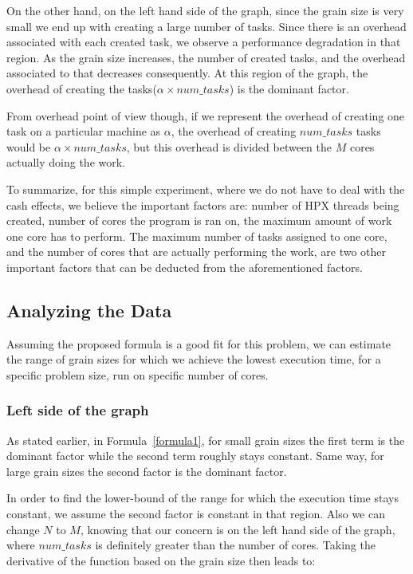 On the other hand, on the left hand side of the graph, since the grain size is very small we end up with creating a large number of tasks. Since there is an overhead associated with each created task, we observe a performance degradation in that region. As the grain size increases, the number of created tasks, and the overhead associated to that decreases consequently. At this region of the graph, the overhead of creating the tasks($\alpha\times{num\_{tasks}}$) is the dominant factor.   





From overhead point of view though, if we represent the overhead of creating one task on a particular machine as $\alpha$, the overhead of creating $num\_{tasks}$ tasks would be $\alpha\times{num\_{tasks}}$, but this overhead is divided between the $M$ cores actually doing the work. 

To summarize, for this simple experiment, where we do not have to deal with the cash effects, we believe the important factors are: number of HPX threads being created, number of cores the program is ran on, the maximum amount of work one core has to perform. The maximum number of tasks assigned to one core, and the number of cores that are actually performing the work, are two other important factors that can be deducted from the aforementioned factors. 

\vspace{\baselineskip}
\subsection{Analyzing the Data}
Assuming the proposed formula is a good fit for this problem, we can estimate the range of grain sizes for which we achieve the lowest execution time, for a specific problem size, run on specific number of cores.

\vspace{\baselineskip}
\subsubsection{Left side of the graph}
As stated earlier, in Formula~\ref{formula1}, for small grain sizes the first term is the dominant factor while the second term roughly stays constant. Same way, for large grain sizes the second factor is the dominant factor. 

In order to find the lower-bound of the range for which the execution time stays constant, we assume the second factor is constant in that region. Also we can change $N$ to $M$, knowing that our concern is on the left hand side of the graph, where $num\_{tasks}$ is definitely greater than the number of cores. 
Taking the derivative of the function based on the grain size then leads to:

